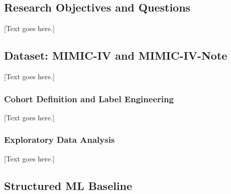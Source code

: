 \documentclass[12pt, a4paper]{article}
\begin{document}

\subsection{Research Objectives and Questions}
%
%

[Text goes here.]

\subsection{Dataset: MIMIC-IV and MIMIC-IV-Note}

[Text goes here.]

\subsubsection{Cohort Definition and Label Engineering}

[Text goes here.]

\subsubsection{Exploratory Data Analysis}

[Text goes here.]

\subsection{Structured ML Baseline}
\end{document}
